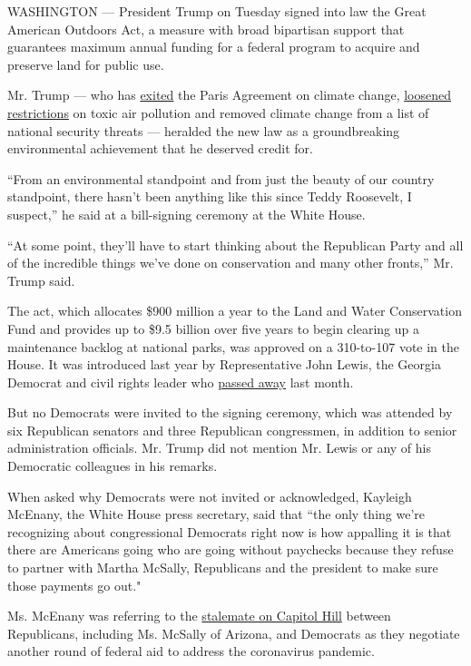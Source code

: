 WASHINGTON --- President Trump on Tuesday signed into law the Great
American Outdoors Act, a measure with broad bipartisan support that
guarantees maximum annual funding for a federal program to acquire and
preserve land for public use.

Mr. Trump --- who has
\href{https://www.nytimes.com/2019/11/04/climate/trump-paris-agreement-climate.html}{exited}
the Paris Agreement on climate change,
\href{https://www.nytimes.com/2020/06/04/climate/trump-environment-coronavirus.html}{loosened
restrictions} on toxic air pollution and removed climate change from a
list of national security threats --- heralded the new law as a
groundbreaking environmental achievement that he deserved credit for.

``From an environmental standpoint and from just the beauty of our
country standpoint, there hasn't been anything like this since Teddy
Roosevelt, I suspect,'' he said at a bill-signing ceremony at the White
House.

``At some point, they'll have to start thinking about the Republican
Party and all of the incredible things we've done on conservation and
many other fronts,'' Mr. Trump said.

The act, which allocates \$900 million a year to the Land and Water
Conservation Fund and provides up to \$9.5 billion over five years to
begin clearing up a maintenance backlog at national parks, was approved
on a 310-to-107 vote in the House. It was introduced last year by
Representative John Lewis, the Georgia Democrat and civil rights leader
who
\href{https://www.nytimes.com/2020/07/17/us/john-lewis-dead.html}{passed
away} last month.

But no Democrats were invited to the signing ceremony, which was
attended by six Republican senators and three Republican congressmen, in
addition to senior administration officials. Mr. Trump did not mention
Mr. Lewis or any of his Democratic colleagues in his remarks.

When asked why Democrats were not invited or acknowledged, Kayleigh
McEnany, the White House press secretary, said that ``the only thing
we're recognizing about congressional Democrats right now is how
appalling it is that there are Americans going who are going without
paychecks because they refuse to partner with Martha McSally,
Republicans and the president to make sure those payments go out."

Ms. McEnany was referring to the
\href{https://www.nytimes.com/2020/08/04/us/politics/coronavirus-recovery-plan-negotiations.html}{stalemate
on Capitol Hill} between Republicans, including Ms. McSally of Arizona,
and Democrats as they negotiate another round of federal aid to address
the coronavirus pandemic.


